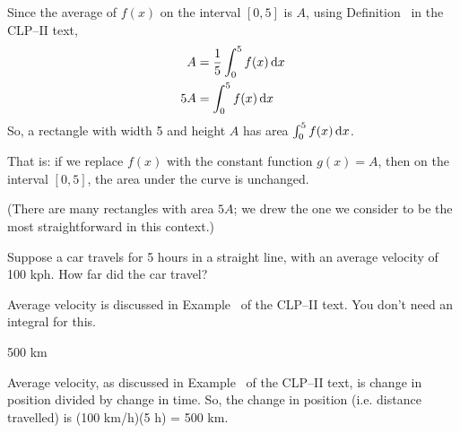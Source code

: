 \begin{solution}
Since the average of $f(x)$ on the interval $[0,5]$ is $A$, using Definition~ in the CLP--II text,
\begin{align*}
A&=\frac{1}{5}\int_0^5 f(x)\,\mathrm{d}x\\
5A&=\int_0^5 f(x)\,\mathrm{d}x
\end{align*}
So, a rectangle with width 5 and height $A$ has area
$\int_0^5 f(x)\,\mathrm{d}x$.

That is: if we replace $f(x)$ with the constant function $g(x)=A$, then on the interval $[0,5]$, the area under the curve is unchanged.

\begin{center}
\end{center}

(There are many rectangles with area $5A$; we drew the one we consider to be the most straightforward in this context.)
\end{solution}
\begin{question}\label{prob_s2.2:vel}
Suppose a car travels for 5 hours in a straight line, with an average velocity of 100 kph. How far did the car travel?
\end{question}
\begin{hint}
Average velocity is discussed in Example~ of the CLP--II text.
You don't need an integral for this.
\end{hint}
\begin{answer}
500 km
\end{answer}
\begin{solution}
Average velocity,  as discussed in Example~ of the CLP--II text,
is change in position divided by change in time. So, the change in position (i.e. distance travelled) is (100 km/h)(5 h) = 500 km.
\end{solution}


